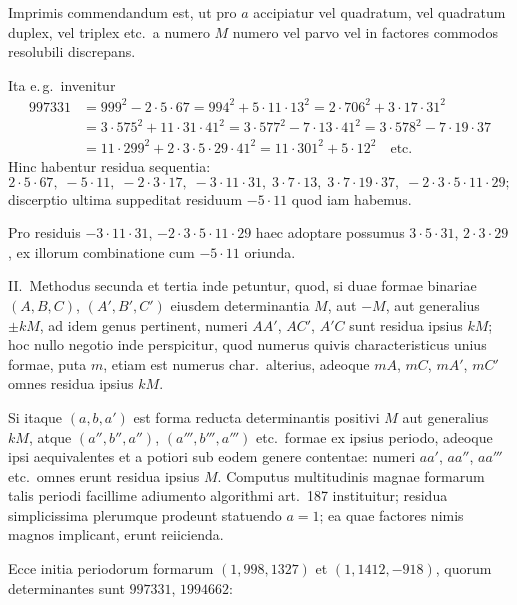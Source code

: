 \documentclass[12pt,a4paper]{article}
\theoremstyle{plain}
\theoremstyle{definition}
\theoremstyle{remark}
\begin{document}
Imprimis commendandum est, ut pro $a$ accipiatur vel quadratum, vel quadratum duplex, vel triplex etc.\ a numero $M$ numero vel parvo vel in factores commodos resolubili discrepans.

Ita e.\,g.\ invenitur
\begin{align*}
997331 &= 999^2-2\cdot 5\cdot 67 = 994^2+5\cdot 11\cdot 13^2 = 2\cdot 706^2+3\cdot 17\cdot 31^2\\
&= 3\cdot 575^2+11\cdot 31\cdot 41^2 = 3\cdot 577^2-7\cdot 13\cdot 41^2 = 3\cdot 578^2-7\cdot 19\cdot 37\\
&= 11\cdot 299^2+2\cdot 3\cdot 5\cdot 29\cdot 41^2 = 11\cdot 301^2+5\cdot 12^2\quad\text{etc.}
\end{align*}
Hinc habentur residua sequentia:
\[2\cdot 5\cdot 67,\; -5\cdot 11,\; -2\cdot 3\cdot 17,\; -3\cdot 11\cdot 31,\; 3\cdot 7\cdot 13,\; 3\cdot 7\cdot 19\cdot 37,\; -2\cdot 3\cdot 5\cdot 11\cdot 29;\]
discerptio ultima suppeditat residuum $-5\cdot 11$ quod iam habemus.

Pro residuis $-3\cdot 11\cdot 31$, $-2\cdot 3\cdot 5\cdot 11\cdot 29$ haec adoptare possumus $3\cdot 5\cdot 31$, $2\cdot 3\cdot 29$, ex illorum combinatione cum $-5\cdot 11$ oriunda.

\textsc{II.}\ Methodus secunda et tertia inde petuntur, quod, si duae formae binariae $(A,B,C)$, $(A',B',C')$ eiusdem determinantia $M$, aut $-M$, aut generalius $\pm kM$, ad idem genus pertinent, numeri $AA'$, $AC'$, $A'C$ sunt residua ipsius $kM$; hoc nullo negotio inde perspicitur, quod numerus quivis characteristicus unius formae, puta $m$, etiam est numerus char.\ alterius, adeoque $mA$, $mC$, $mA'$, $mC'$ omnes residua ipsius $kM$.

Si itaque $(a,b,a')$ est forma reducta determinantis positivi $M$ aut generalius $kM$, atque $(a'',b'',a'')$, $(a''',b''',a''')$ etc.\ formae ex ipsius periodo, adeoque ipsi aequivalentes et a potiori sub eodem genere contentae: numeri $aa'$, $aa''$, $aa'''$ etc.\ omnes erunt residua ipsius $M$. Computus multitudinis magnae formarum talis periodi facillime adiumento algorithmi art.\ 187 instituitur; residua simplicissima plerumque prodeunt statuendo $a=1$; ea quae factores nimis magnos implicant, erunt reiicienda.

Ecce initia periodorum formarum $(1,998,1327)$ et $(1,1412,-918)$, quorum determinantes sunt $997331$, $1994662$:
\end{document}
